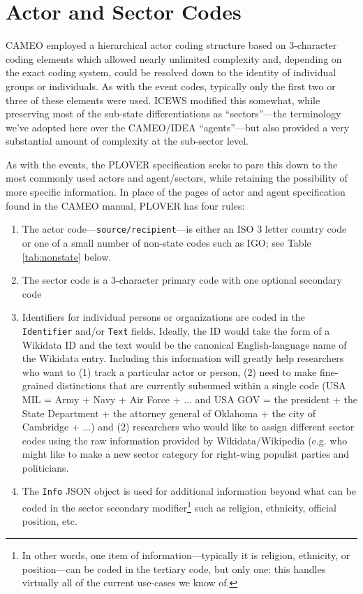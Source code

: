 \documentclass[11pt]{report}
\newcommand{\fn}[1]{\footnote{#1}}
\begin{document}

\chapter{Actor and Sector Codes}

CAMEO employed a hierarchical actor coding structure based on 3-character coding elements which allowed nearly unlimited complexity and, depending on the exact coding system, could be resolved down to the identity of individual groups or individuals. As with the event codes, typically only the first two or three of these elements were used. ICEWS modified this somewhat, while preserving most of the sub-state differentiations as ``sectors''---the terminology we've adopted here over the CAMEO/IDEA ``agents''---but also provided a very substantial amount of complexity at the sub-sector level.

As with the events, the PLOVER specification seeks to pare this down to the most commonly used actors and agent/sectors, while retaining the possibility of more specific information. In place of the pages of actor and agent specification found in the CAMEO manual, PLOVER has four rules:

\begin{enumerate}
\item The actor code---\texttt{source/recipient}---is either an ISO 3 letter country code or one of a small number of non-state codes such as IGO; see Table \ref{tab:nonstate} below.
\item The sector code is a 3-character primary code with one optional secondary code
\item Identifiers for individual persons or organizations are coded in the \texttt{Identifier} and/or \texttt{Text} fields. Ideally, the ID would take the form of a Wikidata ID and the text would be the canonical English-language name of the Wikidata entry. Including this information will greatly help researchers who want to (1) track a particular actor or person, (2) need to make fine-grained distinctions that are currently subsumed within a single code (USA MIL = Army + Navy + Air Force + ... and USA GOV = the president + the State Department + the attorney general of Oklahoma + the city of Cambridge + ...) and (2) researchers who would like to assign different sector codes using the raw information provided by Wikidata/Wikipedia (e.g. who might like to make a new sector category for right-wing populist parties and politicians.
\item The \texttt{Info} JSON object is used for additional information beyond what can be coded in the sector secondary modifier\fn{In other words, one item of information---typically it is religion, ethnicity, or position---can be coded in the tertiary code, but only one: this handles virtually all of the current use-cases we know of.} such as religion, ethnicity, official position, etc.
\end{enumerate}
\end{document}
